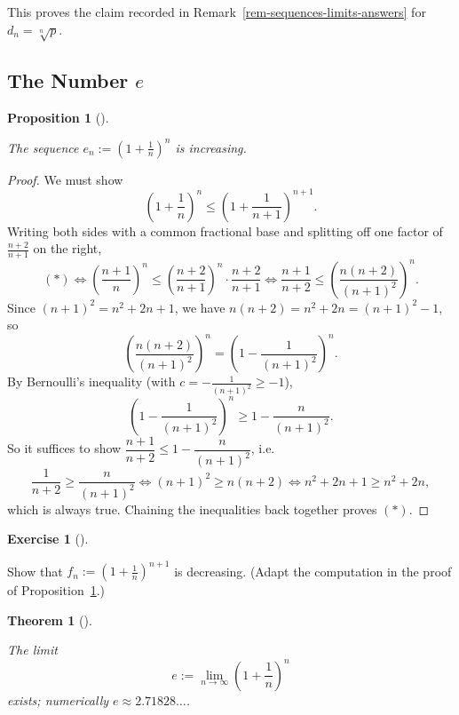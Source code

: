 \documentclass[
  letterpaper,
  DIV=11,
  numbers=noendperiod]{scrreprt}
\theoremstyle{plain}
\theoremstyle{plain}
\newtheorem{proposition}{Proposition}[chapter]
\theoremstyle{definition}
\theoremstyle{definition}
\newtheorem{exercise}{Exercise}[chapter]
\theoremstyle{definition}
\theoremstyle{plain}
\newtheorem{theorem}{Theorem}[chapter]
\theoremstyle{plain}
\theoremstyle{remark}
\begin{document}
This proves the claim recorded in
Remark~\ref{rem-sequences-limits-answers} for \(d_n=\sqrt[n]{p}\).

\subsection{\texorpdfstring{The Number
\(e\)}{The Number e}}\label{the-number-e}

\begin{proposition}[]\protect\hypertarget{prp-e-increasing}{}\label{prp-e-increasing}

\hfill\break
The sequence \(e_n := \left(1+\tfrac1n\right)^n\) is increasing.

\end{proposition}

\begin{proof}
We must show \[
\left(1+\frac1n\right)^n \le \left(1+\frac1{n+1}\right)^{n+1}. \tag{$*$}
\] Writing both sides with a common fractional base and splitting off
one factor of \(\tfrac{n+2}{n+1}\) on the right, \[
(*) \iff \left(\frac{n+1}{n}\right)^n \le \left(\frac{n+2}{n+1}\right)^n \cdot \frac{n+2}{n+1}
\iff \frac{n+1}{n+2} \le \left(\frac{n(n+2)}{(n+1)^2}\right)^{n}.
\] Since \((n+1)^2 = n^2+2n+1\), we have
\(n(n+2) = n^2+2n = (n+1)^2-1\), so \[
\left(\frac{n(n+2)}{(n+1)^2}\right)^{n} = \left(1-\frac{1}{(n+1)^2}\right)^{n}.
\] By Bernoulli's inequality (with \(c=-\tfrac{1}{(n+1)^2}\ge-1\)), \[
\left(1-\frac{1}{(n+1)^2}\right)^{n} \ge 1 - \frac{n}{(n+1)^2}.
\] So it suffices to show \(\dfrac{n+1}{n+2} \le 1-\dfrac{n}{(n+1)^2}\),
i.e. \[
\frac{1}{n+2} \ge \frac{n}{(n+1)^2} \iff (n+1)^2 \ge n(n+2) \iff n^2+2n+1 \ge n^2+2n,
\] which is always true. Chaining the inequalities back together proves
\((*)\).
\end{proof}

\begin{exercise}[]\protect\hypertarget{exr-f-decreasing}{}\label{exr-f-decreasing}

Show that \(f_n := \left(1+\tfrac1n\right)^{n+1}\) is decreasing. (Adapt
the computation in the proof of Proposition~\ref{prp-e-increasing}.)

\end{exercise}

\begin{theorem}[]\protect\hypertarget{thm-e-exists}{}\label{thm-e-exists}

\hfill\break
The limit \[
e := \lim_{n\to\infty}\left(1+\frac1n\right)^n
\] exists; numerically \(e \approx 2.71828\ldots\).

\end{theorem}
\end{document}
